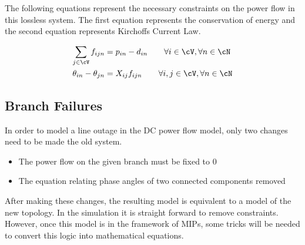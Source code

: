 The following equations represent the necessary constraints on the power flow in this lossless system.  The first equation represents the conservation of energy and the second equation represents Kirchoffs Current Law.

\begin{align}	\displaystyle
\sum_{j \in \cV}{f_{ijn}} &= p_{in} -d_{in} \hspace{20px}   \forall i \in \cV, \forall n \in \cN   \label{pf1}
\\
\theta_{in} - \theta_{jn} &= X_{ij} f_{ijn}			\hspace{20px}	\forall i,j \in \cV, \forall n \in \cN   \label{pf2}
\end{align}


\subsection{Branch Failures}
In order to model a line outage in the DC power flow model, only two changes need to be made the old system.   
\begin{itemize}
\item The power flow on the given branch must be fixed to 0
\item The equation relating phase angles of two connected components removed
\end{itemize}
After making these changes, the resulting model is equivalent to a model of the new topology.  In the simulation it is straight forward to remove constraints.  However, once this model is in the framework of MIPs, some tricks will be needed to convert this logic into mathematical equations.

